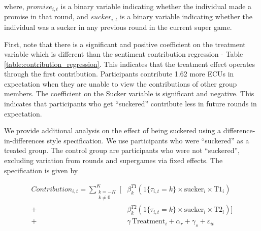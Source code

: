 \documentclass[12pt,letterpaper,english]{article}
\begin{document}
where, $promise_{i,t}$ is a binary variable indicating whether the individual made
a promise in that round, and $sucker_{i,t}$ is a binary variable indicating whether the individual was a sucker in any previous round in the current super game.

First, note that there is a significant and positive coefficient on the treatment variable which is different
than the sentiment contribution regression - Table \ref{table:contribution_regression}. This indicates that the treatment effect operates through the first contribution.
Participants contribute 1.62 more ECUs in expectation when they are unable to view the contributions of other group members. The
coefficient on the Sucker variable is significant and negative. This indicates that participants who get ``suckered''
contribute less in future rounds in expectation.

We provide additional analysis on the effect of being suckered using a difference-in-differences style specification.
We use participants who were ``suckered'' as a treated group. The control group are participants who were not ``suckered'',
excluding variation from rounds and supergames via fixed effects. The specification is given by

\begin{equation}
\begin{split}
    Contribution_{i,t} = \sum_{\substack{k = -K \\ k \neq 0}}^{K} \Big[ &\beta_k^{T1} \left( 1\{\tau_{i,t} = k\} \times \text{sucker}_i \times \text{T1}_i \right) \\
    + &\beta_k^{T2} \left( 1\{\tau_{i,t} = k\} \times \text{sucker}_i \times \text{T2}_i \right) \Big] \\
    + &\gamma \, \text{Treatment}_i + \alpha_r + \gamma_s + \varepsilon_{it}
\end{split}
\label{eq:did_contribution}
\end{equation}
\end{document}
